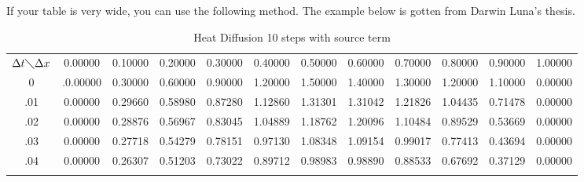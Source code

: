 If your table is very wide, you can use the following method. The example below is gotten from Darwin Luna's thesis. 

\begin{sidewaystable}[htb]
\centering\caption{Heat Diffusion 10 steps with source term}\label{tab:2}
\begin{tabular}{c|c|c|c|c|c|c|c|c|c|c|c}
\hline\noalign{\smallskip}
$\Delta t \diagdown \Delta x$ & 0.00000 &  0.10000 &  0.20000 &  0.30000 &  0.40000 &  0.50000 &  0.60000 &  0.70000 &  0.80000 &  0.90000 &  1.00000\\
\noalign{\smallskip}\hline\noalign{\smallskip}
0 &.0.00000 &  0.30000 &  0.60000 &  0.90000 &  1.20000 &  1.50000 &  1.40000 &  1.30000  & 1.20000 &  1.10000 &  0.00000\\\hline
 .01 & 0.00000 &  0.29660 &  0.58980 &  0.87280 &  1.12860  & 1.31301 &  1.31042 &  1.21826 &  1.04435 &  0.71478 &  0.00000\\\hline
 .02 & 0.00000 &  0.28876 &  0.56967 &  0.83045 &  1.04889 &  1.18762  & 1.20096 &  1.10484 &  0.89529  & 0.53669 &  0.00000\\\hline
 .03 & 0.00000 &  0.27718 &  0.54279 &  0.78151 &  0.97130 &  1.08348 &  1.09154 &  0.99017 &  0.77413 &  0.43694 &  0.00000\\\hline
.04 &  0.00000 &  0.26307 &  0.51203 &  0.73022 &  0.89712 &  0.98983 &  0.98890 &  0.88533 &  0.67692 &  0.37129 &  0.00000\\
\noalign{\smallskip}\hline
\end{tabular}
\end{sidewaystable}

\endinput

